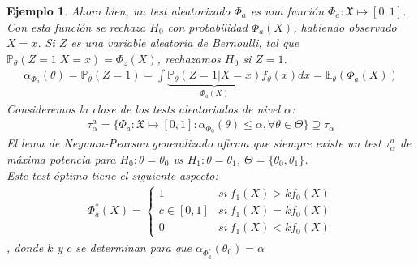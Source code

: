 \documentclass[10pt]{article}
\theoremstyle{plain}
\newtheorem{ej}{Ejemplo}
\theoremstyle{definition}
\begin{document}
\begin{ej}
Ahora bien, un test aleatorizado $\Phi_{a}$ es una función $\Phi_{a} : \mathfrak{X} \mapsto [0,1]$. Con esta función se rechaza $H_{0}$ con probabilidad $\Phi_{a}(X)$, habiendo observado $X=x$. Si $Z$ es una variable aleatoria de Bernoulli, tal que $\mathbb{P}_{\theta}(Z=1|X=x)=\Phi_{z}(X)$, rechazamos $H_{0}$ si $Z=1$.
\begin{align*}
\alpha_{\Phi_{a}}(\theta) = \mathbb{P}_{\theta}(Z=1) = \int{\underbrace{\mathbb{P}_{\theta}(Z=1|X=x)}_{\Phi_{a}(X)}f_{\theta}(x) dx} = \mathbb{E}_{\theta}(\Phi_{a}(X))
\end{align*}
Consideremos la clase de los tests aleatoriados de nivel $\alpha$:
\begin{align*}
\tau_{\alpha}^{a} = \{\Phi_{a}: \mathfrak{X}\mapsto [0,1]\colon \alpha_{\Phi_{0}}(\theta)\le \alpha, \forall \theta \in \Theta\} \supseteq \tau_{\alpha}
\end{align*}
El lema de Neyman-Pearson generalizado afirma que siempre existe un test $\tau_{\alpha}^{a}$ de máxima potencia para $H_{0}: \theta = \theta_{0}$ vs $H_{1}: \theta=\theta_{1}$, $\Theta = \{\theta_{0}, \theta_{1}\}$.\\

Este test óptimo tiene el siguiente aspecto:
\begin{align*}
\Phi_{a}^{*}(X) =
\begin{cases} 
      1 & si\ f_{1}(X)>kf_{0}(X) \\
      c \in [0,1]& si\ f_{1}(X)=kf_{0}(X) \\
      0 & si\ f_{1}(X)<kf_{0}(X)
\end{cases}
\end{align*}
, donde $k$ y $c$ se determinan para que $\alpha_{\Phi_{a}^*}(\theta_{0}) = \alpha$\\


\end{ej}
\end{document}
